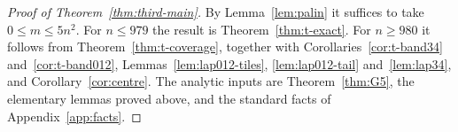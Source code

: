 \begin{proof}[Proof of Theorem~\ref{thm:third-main}]
By Lemma~\ref{lem:palin} it suffices to take $0\le m\le5n^2$. For $n\le979$ the result is Theorem~\ref{thm:t-exact}. For
$n\ge980$ it follows from Theorem~\ref{thm:t-coverage}, together with Corollaries~\ref{cor:t-band34}
and~\ref{cor:t-band012}, Lemmas~\ref{lem:lap012-tiles}, \ref{lem:lap012-tail} and~\ref{lem:lap34}, and
Corollary~\ref{cor:centre}. The analytic inputs are Theorem~\ref{thm:G5}, the elementary lemmas proved above, and the
standard facts of Appendix~\ref{app:facts}.
\end{proof}
